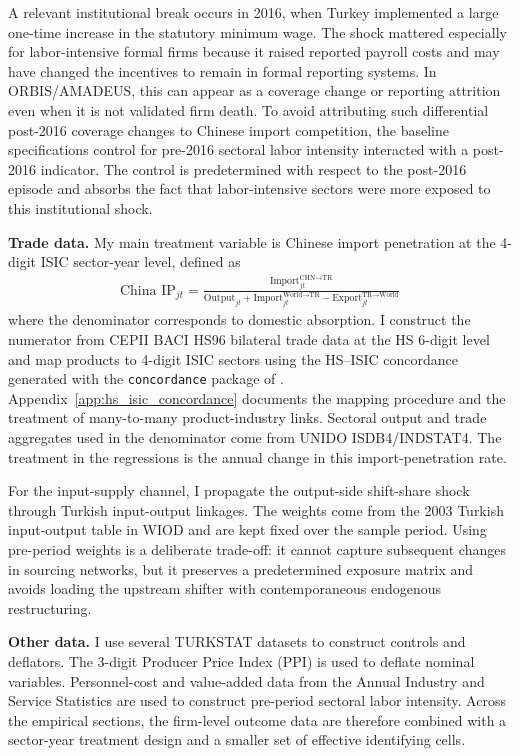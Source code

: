 ﻿\documentclass[12pt]{article}
\begin{document}
A relevant institutional break occurs in 2016, when Turkey implemented a large one-time increase in the statutory minimum wage. The shock mattered especially for labor-intensive formal firms because it raised reported payroll costs and may have changed the incentives to remain in formal reporting systems. In ORBIS/AMADEUS, this can appear as a coverage change or reporting attrition even when it is not validated firm death. To avoid attributing such differential post-2016 coverage changes to Chinese import competition, the baseline specifications control for pre-2016 sectoral labor intensity interacted with a post-2016 indicator. The control is predetermined with respect to the post-2016 episode and absorbs the fact that labor-intensive sectors were more exposed to this institutional shock.

\textbf{Trade data.} My main treatment variable is Chinese import penetration at the 4-digit ISIC sector-year level, defined as
\begin{equation}
    \begin{aligned}
    \text{China IP}_{jt} = \frac{\text{Import}_{jt}^{\text{CHN} \to \text{TR}}}{\text{Output}_{jt} + \text{Import}_{jt}^{\text{World} \to \text{TR}} - \text{Export}_{jt}^{\text{TR} \to \text{World}}} 
\end{aligned}
\end{equation}
where the denominator corresponds to domestic absorption. I construct the numerator from CEPII BACI HS96 bilateral trade data at the HS 6-digit level and map products to 4-digit ISIC sectors using the HS--ISIC concordance generated with the \texttt{concordance} package of \textcite{liaoConcordanceProductConcordance2020}. Appendix~\ref{app:hs_isic_concordance} documents the mapping procedure and the treatment of many-to-many product-industry links. Sectoral output and trade aggregates used in the denominator come from UNIDO ISDB4/INDSTAT4. The treatment in the regressions is the annual change in this import-penetration rate.

For the input-supply channel, I propagate the output-side shift-share shock through Turkish input-output linkages. The weights come from the 2003 Turkish input-output table in WIOD and are kept fixed over the sample period. Using pre-period weights is a deliberate trade-off: it cannot capture subsequent changes in sourcing networks, but it preserves a predetermined exposure matrix and avoids loading the upstream shifter with contemporaneous endogenous restructuring.

\textbf{Other data.} I use several TURKSTAT datasets to construct controls and deflators. The 3-digit Producer Price Index (PPI) is used to deflate nominal variables. Personnel-cost and value-added data from the Annual Industry and Service Statistics are used to construct pre-period sectoral labor intensity. Across the empirical sections, the firm-level outcome data are therefore combined with a sector-year treatment design and a smaller set of effective identifying cells.
\end{document}
